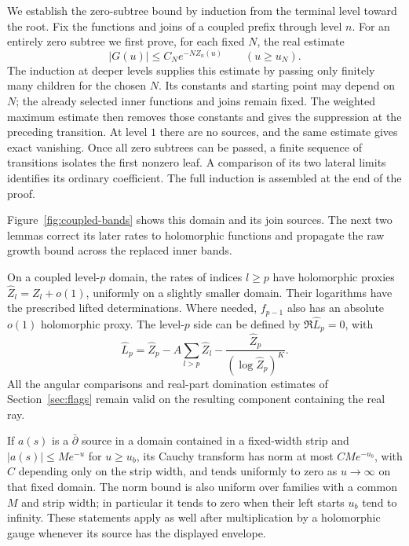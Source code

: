 We establish the zero-subtree bound by induction from the terminal
level toward the root.  Fix the functions and joins of a coupled prefix
through level $n$.  For an entirely zero subtree we first prove,
for each fixed $N$, the real estimate
\[
 |G(u)|\leq C_N e^{-NZ_n(u)}
 \qquad (u\geq u_N).
\]
The induction at deeper levels supplies this estimate by passing
only finitely many children for the chosen $N$.  Its constants and
starting point may depend on $N$; the already selected inner
functions and joins remain fixed.  The weighted maximum estimate
then removes those constants and gives the suppression at the
preceding transition.  At level $1$ there are no sources, and the
same estimate gives exact vanishing.  Once all zero subtrees can be
passed, a finite sequence of transitions isolates the first nonzero
leaf.  A comparison of its two lateral limits identifies its ordinary
coefficient.  The full induction is assembled at the end of the proof.

Figure~\ref{fig:coupled-bands} shows this domain and its join
sources.  The next two lemmas correct its later rates to holomorphic
functions and propagate the raw growth bound across the replaced
inner bands.


\begin{lemma}
\label{lem:separation-proxies}
On a coupled level-$p$ domain, the rates of indices $l\geq p$
have holomorphic proxies $\widehat Z_l=Z_l+o(1)$, uniformly on a
slightly smaller domain.  Their logarithms have the prescribed
lifted determinations.  Where needed, $f_{p-1}$ also has an
absolute $o(1)$ holomorphic proxy.  The level-$p$ side can be
defined by $\Re\widehat L_p=0$, with
\[
 \widehat L_p=\widehat Z_p-A\sum_{l>p}\widehat Z_l
                 -\frac{\widehat Z_p}{(\log\widehat Z_p)^K}.
\]
All the angular comparisons and real-part domination estimates
of Section~\ref{sec:flags} remain valid on the resulting component
containing the real ray.

If $a(s)$ is a $\bar\partial$ source in a domain contained in a
fixed-width strip and $|a(s)|\leq M e^{-u}$ for $u\geq u_b$,
its Cauchy transform has norm at most $C M e^{-u_b}$, with $C$
depending only on the strip width, and tends uniformly to zero
as $u\to\infty$ on that fixed domain.  The norm bound is also
uniform over families with a common $M$ and strip width; in
particular it tends to zero when their left starts $u_b$ tend
to infinity.  These statements apply as well after multiplication
by a holomorphic gauge whenever its source has the displayed
envelope.
\end{lemma}

